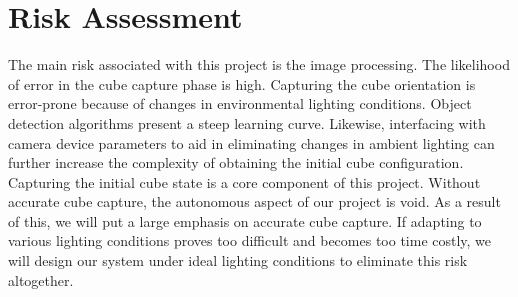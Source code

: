 \documentclass[final, letterpaper, 10 pt, conference, onecolumn]{IEEEtran}
\begin{document}
\begin{table}[!ht]
\caption{Main component BOM}
\label{table:BOM}
\end{table}

\section{Risk Assessment}
The main risk associated with this project is the image processing. The likelihood of error in the cube capture phase is high. Capturing the cube orientation is error-prone because of changes in environmental lighting conditions. Object detection algorithms present a steep learning curve. Likewise, interfacing with camera device parameters to aid in eliminating changes in ambient lighting can further increase the complexity of obtaining the initial cube configuration. Capturing the initial cube state is a core component of this project. Without accurate cube capture, the autonomous aspect of our project is void. As a result of this, we will put a large emphasis on accurate cube capture. If adapting to various lighting conditions proves too difficult and becomes too time costly, we will design our system under ideal lighting conditions to eliminate this risk altogether.
\end{document}

